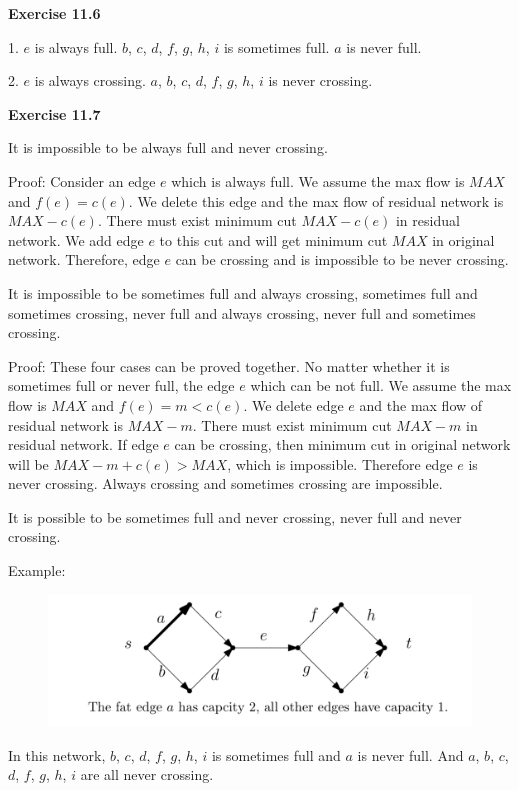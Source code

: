 \documentclass{article} %
\begin{document}
\textbf{Exercise 11.6}\par
	1. $e$ is always full. $b$, $c$, $d$, $f$, $g$, $h$, $i$ is sometimes full. $a$ is never full.\par
	2. $e$ is always crossing. $a$, $b$, $c$, $d$, $f$, $g$, $h$, $i$ is never crossing.\par
	
\textbf{Exercise 11.7}\par
	It is impossible to be always full and never crossing.\par
	Proof: Consider an edge $e$ which is always full. We assume the max flow is $MAX$ and $f(e)=c(e)$. We delete this edge and the max flow of residual network is $MAX-c(e)$.
	There must exist minimum cut $MAX-c(e)$ in residual network. We add edge $e$ to this cut and will get minimum cut $MAX$ in original network. Therefore, edge $e$ can be crossing and  is impossible to be never crossing.\par
	It is impossible to be sometimes full and always crossing, sometimes full and sometimes crossing, never full and always crossing, never full and sometimes crossing.\par
	Proof: These four cases can be proved together. No matter whether it is sometimes full or never full, the edge $e$ which can be not full. We assume the max flow is $MAX$ and
	$f(e)=m<c(e)$. We delete edge $e$ and the max flow of residual network is $MAX-m$. There must exist minimum cut $MAX-m$ in residual network. If edge $e$ can be crossing, then
	minimum cut in 	original network will be $MAX-m+c(e)>MAX$, which is impossible. Therefore edge $e$ is never crossing. Always crossing and sometimes crossing are impossible.\par
	It is possible to be sometimes full and never crossing, never full and never crossing.\par
	Example:\par
    \begin{figure}[H]
  	\centering
  	\includegraphics[scale=0.5]{1.png}
  	\caption{}
  	\label{}
  	\end{figure}
	
	In this network, $b$, $c$, $d$, $f$, $g$, $h$, $i$ is sometimes full and $a$ is never full. And $a$, $b$, $c$, $d$, $f$, $g$, $h$, $i$ are all never crossing.\par
	
\end{document}
